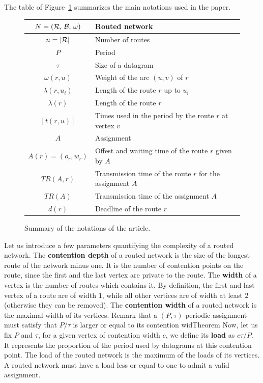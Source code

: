 \documentclass[a4paper,10pt]{article}
\begin{document}
      The table of Figure~\ref{tab:summary} summarizes the main notations used in the paper.
      \begin{figure}
      \begin{center}
   \begin{tabularx}{\textwidth}{|c|X|}
    \hline
     $N = (\cal{R},\,\cal{B},\,\omega)$ & Routed network \\
     \hline
     $n = |\cal{R}|$ & Number of routes\\
     \hline
     $P$ & Period\\
     \hline
     $\tau$ & Size of a datagram\\
     \hline
     $\omega(r,u)$ & Weight of the arc $(u,v)$ of $r$ \\
     \hline
     $\lambda(r,u_i)$ & Length of the route $r$ up to $u_i$\\
     \hline
     $\lambda(r)$ & Length of the route $r$\\
     \hline
     $ [t(r,u)]$& Times used in the period by the route $r$ at vertex $v$\\
     \hline 
     $A$ & Assignment\\
     \hline 
     $A(r) = (o_r,w_r)$ & Offest and waiting time of the route $r$ given by $A$ \\
     \hline 
     $TR(A,r)$& Transmission time of the route $r$ for the assignment $A$\\
     \hline 
     $TR(A)$& Transmission time of the assignment $A$\\
     \hline
     $d(r)$ & Deadline of the route $r$\\
     \hline

      \end{tabularx}
      \end{center}
      \caption{Summary of the notations of the article.}\label{tab:summary}
      \end{figure}
  	
  	Let us introduce a few parameters quantifying the complexity of a routed network.
	The \textbf{contention depth} of a routed network is the size of the longest route of the network minus one. It is the number of contention points on the route, since the first and the last vertex are private to the route. The \textbf{width} of a vertex is the number of routes which contains it. By definition, 
	the first and last vertex of a route are of width $1$, while all other vertices are of width at least $2$
	(otherwise they can be removed).
	The \textbf{contention width} of a routed network is the maximal width of its vertices. 
	Remark that a $(P,\tau)$-periodic assignment must satisfy that $P/\tau$ is larger or equal to its contention widTheorem Now, let us fix $P$ and $\tau$, for a given vertex of contention width $c$, we define its \textbf{load} as $c\tau/P$. It represents the proportion of the period used by datagrams at this contention point. The load of the routed network is the maximum of the loads of its vertices. A routed network must have a load less or equal to one to admit a valid assignment.
\end{document}
